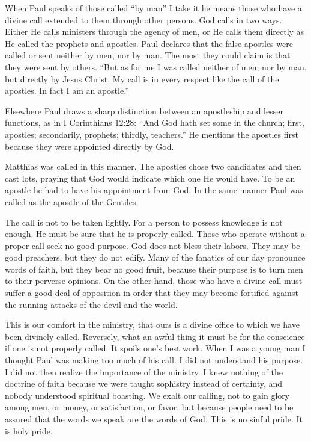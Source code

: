 When Paul speaks of those called “by man” I take it he means those who have a divine call extended to them through other persons. God calls in two ways. Either He calls ministers through the agency of men, or He calls them directly as He called the prophets and apostles. Paul declares that the false apostles were called or sent neither by men, nor by man. The most they could claim is that they were sent by others. “But as for me I was called neither of men, nor by man, but directly by Jesus Christ. My call is in every respect like the call of the apostles. In fact I am an apostle.”

Elsewhere Paul draws a sharp distinction between an apostleship and lesser functions, as in I Corinthians 12:28: “And God hath set some in the church; first, apostles; secondarily, prophets; thirdly, teachers.” He mentions the apostles first because they were appointed directly by God.

Matthias was called in this manner. The apostles chose two candidates and then cast lots, praying that God would indicate which one He would have. To be an apostle he had to have his appointment from God. In the same manner Paul was called as the apostle of the Gentiles.

The call is not to be taken lightly. For a person to possess knowledge is not enough. He must be sure that he is properly called. Those who operate without a proper call seek no good purpose. God does not bless their labors. They may be good preachers, but they do not edify. Many of the fanatics of our day pronounce words of faith, but they bear no good fruit, because their purpose is to turn men to their perverse opinions. On the other hand, those who have a divine call must suffer a good deal of opposition in order that they may become fortified against the running attacks of the devil and the world.

This is our comfort in the ministry, that ours is a divine office to which we have been divinely called. Reversely, what an awful thing it must be for the conscience if one is not properly called. It spoils one’s best work. When I was a young man I thought Paul was making too much of his call. I did not understand his purpose. I did not then realize the importance of the ministry. I knew nothing of the doctrine of faith because we were taught sophistry instead of certainty, and nobody understood spiritual boasting. We exalt our calling, not to gain glory among men, or money, or satisfaction, or favor, but because people need to be assured that the words we speak are the words of God. This is no sinful pride. It is holy pride.

